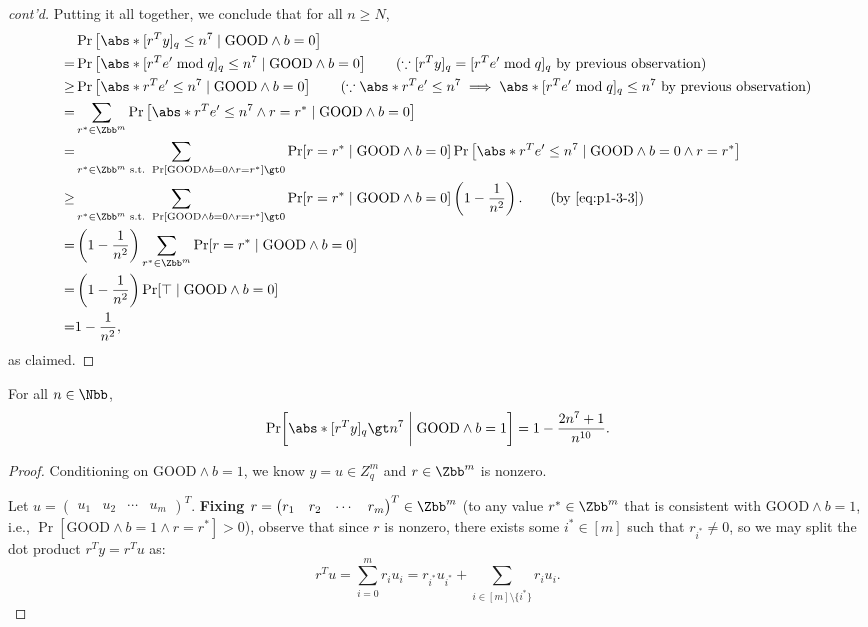 \begin{answer}[iii]
\begin{proof}[cont'd]
        Putting it all together, we conclude that for all $n\ge N$,
        \begin{align*}
            &\Pr\left[\abs*{[r^Ty]_q} \le n^7 \mid \textrm{GOOD} \land b=0\right]\\
            =& \Pr\left[\abs*{[r^Te' \bmod q ]_q} \le n^7 \mid \textrm{GOOD} \land b=0\right]
            \qquad (\because [r^Ty]_q = [r^Te' \bmod q ]_q \textrm{ by previous observation})\\
            \ge&  \Pr\left[\abs*{r^Te'} \le n^7 \mid \textrm{GOOD} \land b=0\right]
            \qquad (\because \abs*{r^Te'} \le n^7 \implies  \abs*{[r^Te' \bmod q ]_q} \le n^7 \textrm{ by previous observation})\\
            =& \sum_{r^\ast\in\Zbb^m}\Pr\left[\abs*{r^Te'} \le n^7 \land r=r^\ast \mid \textrm{GOOD} \land b=0\right]\\
            =& \sum_{r^\ast\in\Zbb^m \textrm{ s.t. } \Pr[\textrm{GOOD} \land b=0 \land r=r^\ast]\gt 0}\Pr[r=r^\ast \mid \textrm{GOOD} \land b=0] \Pr\left[\abs*{r^Te'} \le n^7 \mid \textrm{GOOD} \land b=0 \land r=r^\ast\right]\\
            \ge& \sum_{r^\ast\in\Zbb^m \textrm{ s.t. } \Pr[\textrm{GOOD} \land b=0 \land r=r^\ast]\gt 0}\Pr[r=r^\ast \mid \textrm{GOOD} \land b=0] \left( 1-\frac{1}{n^2}\right). \qquad (\textrm{by \eqref{eq:p1-3-3}})\\
            =& \left( 1-\frac{1}{n^2}\right) \sum_{r^\ast\in\Zbb^m}\Pr[r=r^\ast \mid \textrm{GOOD} \land b=0]\\
            =& \left( 1-\frac{1}{n^2}\right) \Pr[\top \mid \textrm{GOOD} \land b=0]\\
            =& 1-\frac{1}{n^2},
        \end{align*}
        as claimed.
    \end{proof}

    \begin{claim}[Case 3]\label{claim:p1-3-2}
        For all $n\in\Nbb$,
        \[
            \Pr\biggl[\abs*{[r^Ty]_q}\gt n^7 \biggm\vert \textrm{GOOD} \land b=1 \biggr]= 1- \frac{2n^7+1}{n^{10}}.
        \]
    \end{claim}
    \begin{proof}
        Conditioning on $\textrm{GOOD} \land b=1$, we know $y=u\in Z_q^m$ and $r\in\Zbb^m$ is nonzero. 

        Let $u=\begin{pmatrix}
            u_1 & u_2 & \cdots& u_m 
        \end{pmatrix}^T$. 
        \textbf{Fixing $r=\begin{pmatrix}
            r_1 & r_2 & \cdots& r_m 
        \end{pmatrix}^T\in\Zbb^m$} (to any value $r^\ast\in\Zbb^m$ that is consistent with $ \textrm{GOOD}\land b=1$, i.e., $\Pr[\textrm{GOOD} \land b=1 \land r=r^\ast]\gt 0$), observe that since $r$ is nonzero, there exists some $i^\ast\in [m]$ such that $r_{i^\ast}\neq 0$, so we may split the dot product $r^Ty=r^Tu$ as:
        \[
            r^Tu = \sum_{i=0}^m r_iu_i=r_{i^\ast}u_{i^\ast}+\sum_{i\in [m]\setminus \{i^\ast\}} r_iu_i.
        \]
        

\end{proof}
\end{answer}
